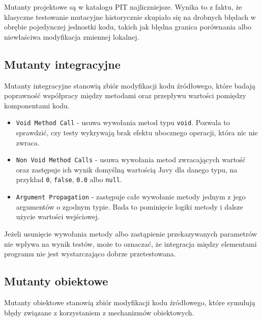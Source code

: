 \documentclass[12pt,a4paper,oldfontcommands]{memoir}
\theoremstyle{plain}
\theoremstyle{definition}
\theoremstyle{remark}
\begin{document}
    Mutanty projektowe są w katalogu PIT najliczniejsze.
    Wynika to z faktu, że klasyczne testowanie mutacyjne historycznie skupiało się na drobnych błędach w obrębie pojedynczej jednostki kodu, takich jak błędna granica porównania albo niewłaściwa modyfikacja zmiennej lokalnej.

    \subsection{Mutanty integracyjne}

    Mutanty integracyjne stanowią zbiór modyfikacji kodu źródłowego, które badają poprawność współpracy między metodami oraz przepływu wartości pomiędzy komponentami kodu.

    \begin{itemize}
        \item \texttt{Void Method Call} - usuwa wywołania metod typu \texttt{void}. Pozwala to sprawdzić, czy testy wykrywają brak efektu ubocznego operacji, która nic nie zwraca.
        \item \texttt{Non Void Method Calls} - usuwa wywołania metod zwracających wartość oraz zastępuje ich wynik domyślną wartością Javy dla danego typu, na przykład \texttt{0}, \texttt{false}, \texttt{0.0} albo \texttt{null}.
        \item \texttt{Argument Propagation} - zastępuje całe wywołanie metody jednym z jego argumentów o zgodnym typie. Bada to pominięcie logiki metody i dalsze użycie wartości wejściowej.
    \end{itemize}

    Jeżeli usunięcie wywołania metody albo zastąpienie przekazywanych parametrów nie wpływa na wynik testów, może to oznaczać, że integracja między elementami programu nie jest wystarczająco dobrze przetestowana.

    \subsection{Mutanty obiektowe}

    Mutanty obiektowe stanowią zbiór modyfikacji kodu źródłowego, które symulują błędy związane z korzystaniem z mechanizmów obiektowych.
\end{document}
